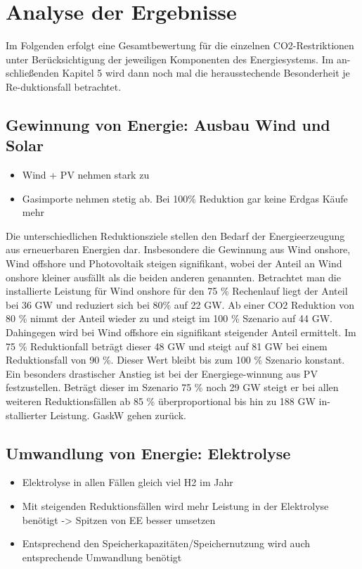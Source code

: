 \section{Analyse der Ergebnisse}
Im Folgenden erfolgt eine Gesamtbewertung für die einzelnen CO2-Restriktionen unter Berücksichtigung der jeweiligen Komponenten des Energiesystems. Im an-schließenden Kapitel 5 wird dann noch mal die herausstechende Besonderheit je Re-duktionsfall betrachtet. 

\subsection{Gewinnung von Energie: Ausbau Wind und Solar}
\begin{itemize}
  \item Wind + PV nehmen stark zu
  \item Gasimporte nehmen stetig ab. Bei 100\% Reduktion gar keine Erdgas Käufe mehr
\end{itemize}
Die unterschiedlichen Reduktionsziele stellen den Bedarf der Energieerzeugung aus erneuerbaren Energien dar. Insbesondere die Gewinnung aus Wind onshore, Wind offshore und Photovoltaik steigen signifikant, wobei der Anteil an Wind onshore kleiner ausfällt als die beiden anderen genannten. Betrachtet man die installierte Leistung für Wind onshore für den 75 \% Rechenlauf liegt der Anteil bei 36 GW und reduziert sich bei 80\% auf 22 GW. Ab einer CO2 Reduktion von 80 \% nimmt der Anteil wieder zu und steigt im 100 \% Szenario auf 44 GW. Dahingegen wird bei Wind offshore ein signifikant steigender Anteil ermittelt. Im 75 \% Reduktionfall beträgt dieser 48 GW und steigt auf 81 GW bei einem Reduktionsfall von 90 \%. Dieser Wert bleibt bis zum 100 \% Szenario konstant. Ein besonders drastischer Anstieg ist bei der Energiege-winnung aus PV festzustellen. Beträgt dieser im Szenario 75 \% noch 29 GW steigt er bei allen weiteren Reduktionsfällen ab 85 \% überproportional bis hin zu 188 GW in-stallierter Leistung. 
GaskW gehen zurück. 



\subsection{Umwandlung von Energie: Elektrolyse}
\begin{itemize}
  \item Elektrolyse in allen Fällen gleich viel H2 im Jahr
  \item Mit steigenden Reduktionsfällen wird mehr Leistung in der Elektrolyse benötigt -> Spitzen von EE besser umsetzen
  \item Entsprechend den Speicherkapazitäten/Speichernutzung wird auch entsprechende Umwandlung benötigt
\end{itemize}


